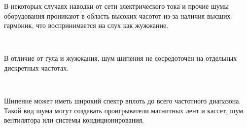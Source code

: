 \documentclass{beamer}
\begin{document}
\begin{frame}
В некоторых случаях наводки от сети электрического тока и прочие шумы оборудования проникают в область высоких часотот из-за наличия высших гармоник, что воспринимается на слух как жужжание. 


~

\end{frame}

\begin{frame}
В отличие от гула и жужжания, шум шипения не сосредоточен на отдельных дискретных частотах. 

~

Шипение может иметь широкий спектр вплоть до всего частотного диапазона. Такой вид шума могут создавать проигрыватели магнитных лент и кассет, шум вентилятора или системы кондиционирования. 

\end{frame}
\end{document}
